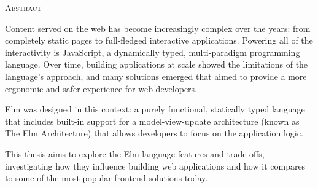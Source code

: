 \begin{center}
  \textsc{Abstract}
\end{center}
\noindent

Content served on the web has become increasingly complex over the years: from completely static pages to full-fledged interactive applications. Powering all of the interactivity is JavaScript, a dynamically typed, multi-paradigm programming language. Over time, building applications at scale showed the limitations of the language's approach, and many solutions emerged that aimed to provide a more ergonomic and safer experience for web developers.

Elm was designed in this context: a purely functional, statically typed language that includes built-in support for a model-view-update architecture (known as The Elm Architecture) that allows developers to focus on the application logic.

This thesis aims to explore the Elm language features and trade-offs, investigating how they influence building web applications and how it compares to some of the most popular frontend solutions today.
